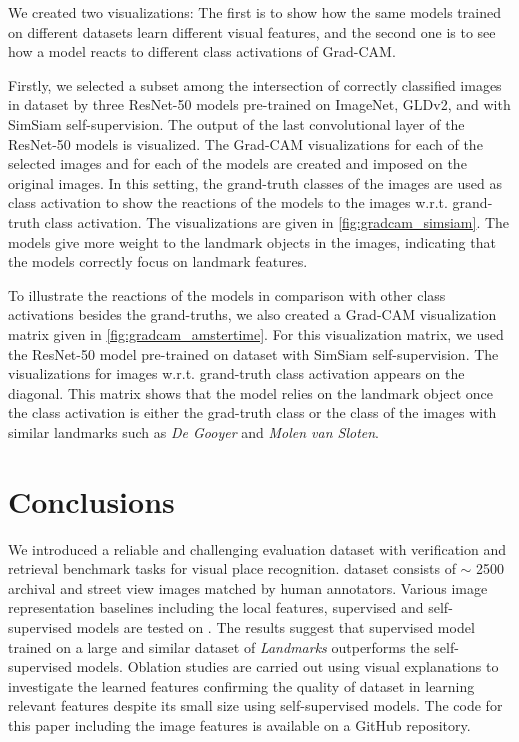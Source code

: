 \documentclass[a4paper,conference]{IEEEtran}
\begin{document}
We created two visualizations: The first is to show how the same models trained on different datasets learn different visual features, and the second one is to see how a model reacts to different class activations of Grad-CAM.

Firstly, we selected a subset among the intersection of correctly classified images in \amsterdam dataset by three ResNet-50 models pre-trained on ImageNet, GLDv2, and \amstertime with SimSiam self-supervision. The output of the last convolutional layer of the ResNet-50 models is visualized. The Grad-CAM visualizations for each of the selected images and for each of the models are created and imposed on the original images. In this setting, the grand-truth classes of the images are used as class activation to show the reactions of the models to the images w.r.t. grand-truth class activation. The visualizations are given in \cref{fig:gradcam_simsiam}. The models give more weight to the landmark objects in the images, indicating that the models correctly focus on landmark features.

To illustrate the reactions of the models in comparison with other class activations besides the grand-truths, we also created a Grad-CAM visualization matrix given in \cref{fig:gradcam_amstertime}. For this visualization matrix, we used the ResNet-50 model pre-trained on \amstertime dataset with SimSiam self-supervision. The visualizations for images w.r.t. grand-truth class activation appears on the diagonal. This matrix shows that the model relies on the landmark object once the class activation is either the grad-truth class or the class of the images with similar landmarks such as \textit{De Gooyer} and \textit{Molen van Sloten}. \section{Conclusions}
We introduced \amstertime a reliable and challenging evaluation dataset with verification and retrieval benchmark tasks for visual place recognition. \amstertime dataset consists of $\sim$ 2500 archival and street view images matched by human annotators. Various image representation baselines including the local features, supervised and self-supervised models are tested on \amstertime. The results suggest that supervised model trained on a large and similar dataset of {\textit{Landmarks}} outperforms the self-supervised models.  Oblation studies are carried out using visual explanations to investigate the learned features confirming the quality of \amstertime dataset in learning relevant features despite its small size using self-supervised models. The code for this paper including the image features is available on a GitHub repository.  
\end{document}
